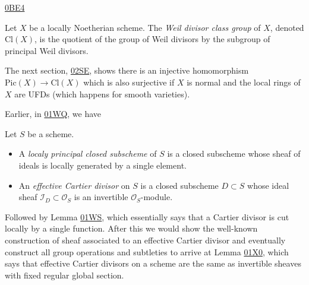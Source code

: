 \begin{definition}
\label{definition-weil-divisor-class-group}
\begin{reference}
\href{https://stacks.math.columbia.edu/tag/0BE4}{0BE4}
\end{reference}
Let $X$ be a locally Noetherian scheme.
The {\it Weil divisor class group} of $X$, denoted
$\text{Cl}(X)$, is the quotient
of the group of Weil divisors by the subgroup of principal
Weil divisors.
\end{definition}

\noindent
The next section, \href{https://stacks.math.columbia.edu/tag/02SE}{02SE},
shows there is an injective homomorphism
$\text{Pic}(X) \to \text{Cl}(X)$
which is also surjective if $X$ is normal
and the local rings of $X$ are UFDs
(which happens for smooth varieties).

\medskip\noindent
Earlier, in \href{https://stacks.math.columbia.edu/tag/01WQ}{01WQ},
we have

\begin{definition}
\label{definition-cartier-divisor}
Let $S$ be a scheme.
\begin{itemize}
\item A {\it localy principal closed subscheme} of $S$ 
is a closed subscheme whose sheaf of ideals
is locally generated by a single element.

\item An {\it effective Cartier divisor} on $S$ 
is a closed subscheme $D \subset S$ whose ideal sheaf
$\mathcal{I}_D \subset \mathcal{O}_S$ is an invertible
$\mathcal{O}_S$-module.
\end{itemize}
\end{definition}

\noindent
Followed by Lemma 
\href{https://stacks.math.columbia.edu/tag/01WS}{01WS},
which essentially says that a Cartier
divisor is cut locally by a single function.
After this we would show the well-known
construction of sheaf associated to an effective Cartier divisor
and eventually construct all group operations and subtleties
to arrive at Lemma \href{https://stacks.math.columbia.edu/tag/01X0}{01X0},
which says that effective Cartier divisors on a scheme
are the same as invertible sheaves with fixed regular global section.

